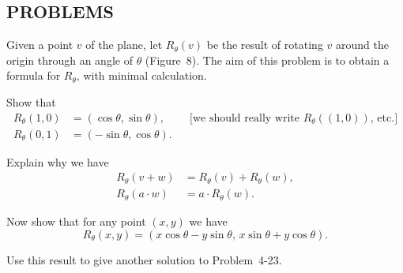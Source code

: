 \subsection*{PROBLEMS}

 Given a point $v$ of the plane, let $R_{\theta}(v)$ be the result of
rotating $v$ around the origin through an angle of $\theta$ (Figure~8). The aim
of this problem is to obtain a formula for $R_{\theta}$, with minimal
calculation.
\begin{letters}
\item Show that
  \begin{align*}
  R_{\theta}(1,0)&=(\cos\theta,\sin\theta),
  &&\text{[we should really write $R_{\theta}((1,0))$, etc.]}\\
  R_{\theta}(0,1)&=(-\sin\theta,\cos\theta).
  \end{align*}
\item Explain why we have
  \begin{align*}
  R_{\theta}(v+w)&=R_{\theta}(v)+R_{\theta}(w),\\
  R_{\theta}(a\cdot w)&=a\cdot R_{\theta}(w).
  \end{align*}
\item Now show that for any point $(x,y)$ we have
  \[
  R_{\theta}(x,y)=(x\cos\theta-y\sin\theta,\,x\sin\theta+y\cos\theta).
  \]
\item Use this result to give another solution to Problem~4-23.
\end{letters}

\begin{center}
\\[0.6em]
\end{center}

